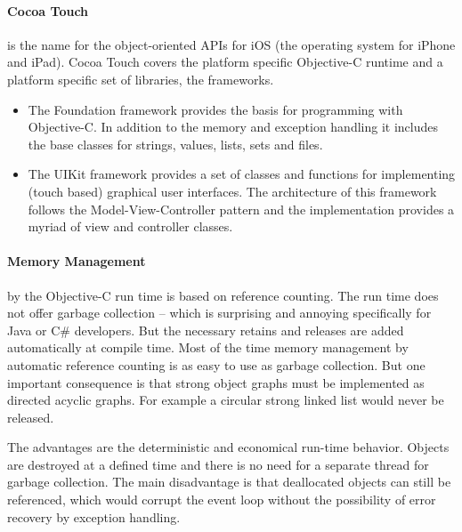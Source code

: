 \paragraph{Cocoa Touch}
\label{sec:Cocoa}
is the name for the object-oriented APIs for iOS (the operating system for iPhone and iPad). 
Cocoa Touch covers the platform specific Objective-C runtime and a platform specific set of libraries, the frameworks.

\begin{itemize}
\item\label{secitem:CocoaFoundation}
The Foundation framework provides the basis for programming with Objective-C. 
In addition to the memory and exception handling it includes the base classes for strings, values, lists, sets and files.
\item\label{secitem:CocoaUIKit} The UIKit framework provides a set of classes and functions for implementing (touch based) graphical user interfaces. 
The architecture of this framework follows the Model-View-Controller pattern 
and the implementation provides a myriad of view and controller classes.
\end{itemize}

\paragraph{Memory Management} 
\label{sec:MemoryManagement}
by the Objective-C run time is based on reference counting. 
The run time does not offer  garbage collection – which is surprising and annoying specifically for Java or C\# developers. 
But the necessary retains and releases are added automatically at compile time.
Most of the time memory management by automatic reference counting is as easy to use as garbage collection.
But one important consequence is that strong object graphs must be implemented as directed acyclic graphs. 
For example a circular strong linked list would never be released. 

The advantages are the deterministic and economical run-time behavior.
Objects are destroyed at a defined time and there is no need for a separate thread for garbage collection. 
The main disadvantage is that deallocated objects can still be referenced, 
which would corrupt the event loop
without the possibility of error recovery by exception handling.



